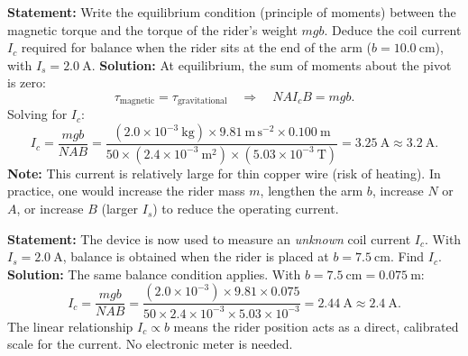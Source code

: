 \documentclass[11pt]{article}
\begin{document}
\begin{exoresolu}
\textbf{Statement:} Write the equilibrium condition (principle of moments) between the magnetic torque and the torque of the rider's weight $mgb$. Deduce the coil current $I_c$ required for balance when the rider sits at the end of the arm ($b = 10.0\ \mathrm{cm}$), with $I_s = 2.0\ \mathrm{A}$.
\tcblower
\textbf{Solution:}
At equilibrium, the sum of moments about the pivot is zero:
\[
\tau_{\text{magnetic}} = \tau_{\text{gravitational}} \quad \Longrightarrow \quad N A I_c B = m g b.
\]
Solving for $I_c$:
\[
I_c = \frac{m g b}{N A B}
= \frac{(2.0 \times 10^{-3}\ \mathrm{kg}) \times 9.81\ \mathrm{m\,s^{-2}} \times 0.100\ \mathrm{m}}
{50 \times (2.4 \times 10^{-3}\ \mathrm{m^2}) \times (5.03 \times 10^{-3}\ \mathrm{T})}
= 3.25\ \mathrm{A} \approx 3.2\ \mathrm{A}.
\]
\textbf{Note:} This current is relatively large for thin copper wire (risk of heating). In practice, one would increase the rider mass $m$, lengthen the arm $b$, increase $N$ or $A$, or increase $B$ (larger $I_s$) to reduce the operating current.
\end{exoresolu}

\begin{exoresolu}
\textbf{Statement:} The device is now used to measure an \emph{unknown} coil current $I_c$. With $I_s = 2.0\ \mathrm{A}$, balance is obtained when the rider is placed at $b = 7.5\ \mathrm{cm}$. Find $I_c$.
\tcblower
\textbf{Solution:}
The same balance condition applies. With $b = 7.5\ \mathrm{cm} = 0.075\ \mathrm{m}$:
\[
I_c = \frac{m g b}{N A B}
= \frac{(2.0 \times 10^{-3}) \times 9.81 \times 0.075}
{50 \times 2.4 \times 10^{-3} \times 5.03 \times 10^{-3}}
= 2.44\ \mathrm{A} \approx 2.4\ \mathrm{A}.
\]
The linear relationship $I_c \propto b$ means the rider position acts as a direct, calibrated scale for the current. No electronic meter is needed.
\end{exoresolu}
\end{document}
